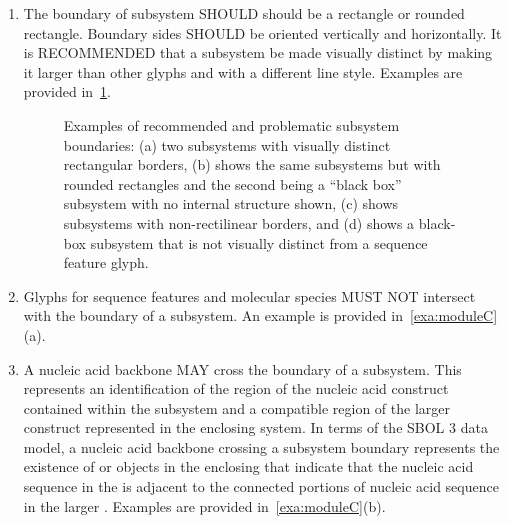 \begin{enumerate}
\item The boundary of subsystem SHOULD should be a rectangle or rounded rectangle. Boundary sides SHOULD be oriented vertically and horizontally.  
	It is RECOMMENDED that a subsystem be made visually distinct by making it larger than other glyphs and with a different line style.
	Examples are provided in~\ref{exa:moduleA}.

	\begin{figure}[h!]
	\centering
	\caption{Examples of recommended and problematic subsystem boundaries: (a) two subsystems with visually distinct rectangular borders, (b) shows the same subsystems but with rounded rectangles and the second being a ``black box'' subsystem with no internal structure shown, (c) shows subsystems with non-rectilinear borders, and (d) shows a black-box subsystem that is not visually distinct from a sequence feature glyph.}
	\label{exa:moduleA}
	\end{figure}

\item Glyphs for sequence features and molecular species MUST NOT intersect with the boundary of a subsystem.
	An example is provided in~\ref{exa:moduleC}(a).

\item A nucleic acid backbone MAY cross the boundary of a subsystem. This represents an identification of the region of the nucleic acid construct contained within the subsystem and a compatible region of the larger construct represented in the enclosing system.
	In terms of the SBOL 3 data model, a nucleic acid backbone crossing a subsystem boundary represents the existence of   or  objects in the enclosing  that indicate that the nucleic acid sequence in the  is adjacent to the connected portions of nucleic acid sequence in the larger .
	Examples are provided in~\ref{exa:moduleC}(b).
	

\end{enumerate}
